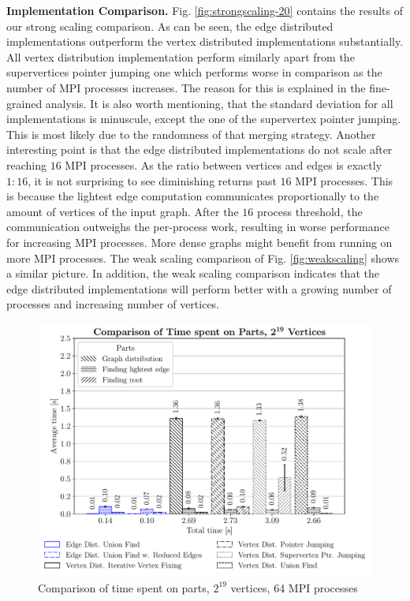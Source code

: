 \documentclass[letterpaper]{article}
\newcommand{\mypar}[1]{{\bf #1.}}
\begin{document}
\mypar{Implementation Comparison}
Fig. \ref{fig:strongscaling-20} contains the results of our strong scaling comparison. As can be seen, the edge
distributed implementations outperform the vertex distributed implementations substantially. All vertex distribution
implementation perform similarly apart from the supervertices pointer jumping one which performs worse in comparison as
the number of MPI processes increases. The reason for this is explained in the fine-grained analysis. It is also worth
mentioning, that the standard deviation for all implementations is minuscule, except the one of the supervertex pointer
jumping. This is most likely due to the randomness of that merging strategy. Another interesting point is that the edge
distributed implementations do not scale after reaching $16$ MPI processes. As the ratio between vertices and edges is
exactly $1:16$, it is not surprising to see diminishing returns past $16$ MPI processes. This is because the lightest
edge computation communicates proportionally to the amount of vertices of the input graph. After the $16$ process
threshold, the communication outweighs the per-process work, resulting in worse performance for increasing MPI
processes. More dense graphs might benefit from running on more MPI processes. The weak scaling comparison of Fig.
\ref{fig:weakscaling} shows a similar picture. In addition, the weak scaling comparison indicates that the edge
distributed implementations will perform better with a growing number of processes and increasing number of vertices.

\begin{figure}
  \includegraphics[width=\columnwidth]{../benchmark-results/plots/comparison.pdf}
  \caption{Comparison of time spent on parts, $2^{19}$ vertices, 64 MPI processes}
  \label{fig:comparison}
\end{figure}
\end{document}
